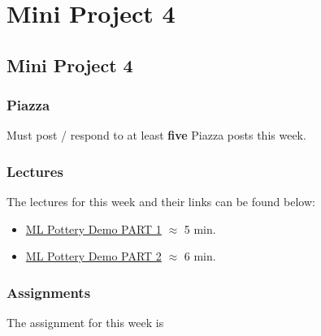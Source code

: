 \clearpage

\renewcommand{\ChapTitle}{Mini Project 4}
\renewcommand{\SectionTitle}{Mini Project 4}

\chapter{\ChapTitle}
\section{\SectionTitle}

\subsection{Piazza}

Must post / respond to at least \textbf{five} Piazza posts this week.  

\subsection{Lectures}

The lectures for this week and their links can be found below:

\begin{itemize}
    \item \href{https://applied.cs.colorado.edu/mod/hvp/view.php?id=49426}{ML Pottery Demo PART 1} $\approx$ 5 min.
    \item \href{https://applied.cs.colorado.edu/mod/hvp/view.php?id=49427}{ML Pottery Demo PART 2} $\approx$ 6 min.
\end{itemize}

\subsection{Assignments}

The assignment for this week is   